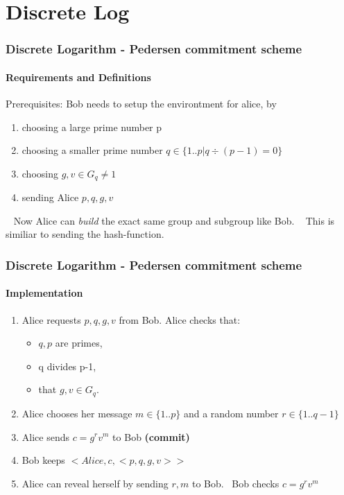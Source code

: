 \section{Discrete Log}
\begin{frame}
	\frametitle{Discrete Logarithm - Pedersen commitment scheme}
	\framesubtitle{Requirements and Definitions}
	Prerequisites: Bob needs to setup the environtment for alice, by 
	\begin{Large}
		\begin{enumerate}
			\item choosing a large prime number p
			\item choosing a smaller prime number $q \in \{1..p| q\div (p-1) = 0\}$
			\item choosing $g,v \in G_q \neq 1$
			\item sending Alice $p,q,g,v$ 
		\end{enumerate}
	\end{Large}
	~\newline
	Now Alice can \textit{build} the exact same group and subgroup like Bob. ~\newline
	This is similiar to sending the hash-function.  
\end{frame}

\begin{frame}
	\frametitle{Discrete Logarithm - Pedersen commitment scheme}
	\framesubtitle{Implementation}
	\begin{Large}
		\begin{enumerate}
			\item Alice requests $p,q,g,v$ from Bob. \newline Alice checks that:
			\begin{itemize}
				\item $q,p$ are primes, 
				\item q divides p-1, 
				\item that $g,v \in G_q$. 
			\end{itemize}
			\item Alice chooses her message $m \in \{1..p\}$ and a random number $r \in \{1..q-1\}$
			\item Alice sends $c = g^rv^m$ to Bob \textbf{(commit)}
			\item Bob keeps $<Alice,c,<p,q,g,v>>$
			\item Alice can reveal herself by sending $r,m$ to Bob. ~\newline Bob checks $c = g^rv^m$
		\end{enumerate}
	\end{Large}
\end{frame}

